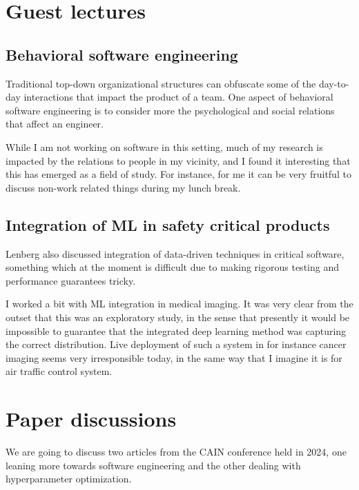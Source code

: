 \documentclass[11pt]{diazessay}
\begin{document}
\section*{Guest lectures}


\subsection*{Behavioral software engineering}


Traditional top-down organizational structures can obfuscate some of the day-to-day interactions that impact the product of a team. One aspect of behavioral software engineering is to consider more the psychological and social relations that affect an engineer\cite{lenberg2015behavioral}.

While I am not working on software in this setting, much of my research is impacted by the relations to people in my vicinity, and I found it interesting that this has emerged as a field of study.
For instance, for me it can be very fruitful to discuss non-work related things during my lunch break.


\subsection*{Integration of ML in safety critical products}

Lenberg also discussed integration of data-driven techniques in critical software, something which at the moment is difficult due to making rigorous testing and performance guarantees tricky.

I worked a bit with ML integration in medical imaging. It was very clear from the outset that this was an exploratory study, in the sense that presently it would be impossible to guarantee that the integrated deep learning method was capturing the correct distribution. Live deployment of such a system in for instance cancer imaging seems very irresponsible today, in the same way that I imagine it is for air traffic control system.

\section*{Paper discussions}

We are going to discuss two articles from the CAIN conference held in 2024, one leaning more towards software engineering and the other dealing with hyperparameter optimization.
\end{document}
